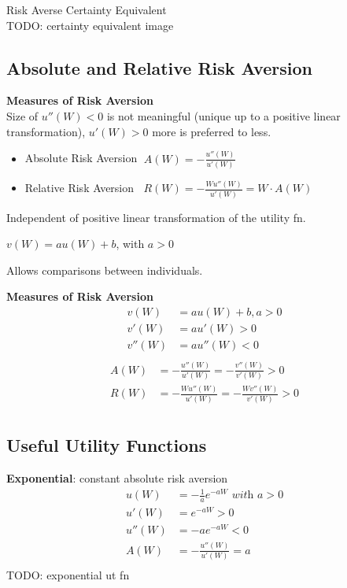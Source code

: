 \documentclass[
14pt,notheorems,hyperref={pdfauthor=whatever}
]{beamer}
\begin{document}
\begin{frame}
Risk Averse Certainty Equivalent\\
TODO: certainty equivalent image
\end{frame}

\subsection{Absolute and Relative Risk Aversion}

\begin{frame}
\textbf{Measures of Risk Aversion}\\
\hfill \break
Size of  $u''(W)<0$  is not meaningful (unique up to a positive linear transformation),  $u'(W)>0$ more is preferred to less.\\
\begin{itemize}
    \item Absolute Risk Aversion $\;A(W) = -\frac{u''(W)}{u'(W)}$\\
    \item Relative Risk Aversion $\;\;R(W) = -\frac{Wu''(W)}{u'(W)} = W\cdot A(W)$\\
\end{itemize}
\hfill \break
Independent of positive linear transformation of the utility fn.
\begin{center}
    $v(W)=au(W)+b$, with $a>0$\\
\end{center}
Allows comparisons between individuals.\\
\end{frame}

\begin{frame}
\textbf{Measures of Risk Aversion}\\
\hfill \break
\begin{align*}
    v(W)&=au(W)+b, a>0\\
    v'(W)&=au'(W)>0\\
    v''(W)&=au''(W)<0\\
\end{align*}
\begin{align*}
    A(W)&=-\frac{u''(W)}{u'(W)}=-\frac{v''(W)}{v'(W)}>0\\
    R(W)&=-\frac{Wu''(W)}{u'(W)}=-\frac{Wv''(W)}{v'(W)}>0\\
\end{align*}
\end{frame}

\subsection{Useful Utility Functions}
\begin{frame}
\textbf{Exponential}: constant absolute risk aversion\\
\begin{align*}
    u(W)&=-\frac{1}{a}e^{-aW} \textit{ with } a>0\\
    u'(W)&=e^{-aW}>0\\
    u''(W)&=-ae^{-aW}<0\\
    A(W)&=-\frac{u''(W)}{u'(W)} = a\\
\end{align*}
TODO: exponential ut fn
\end{frame}
\end{document}
